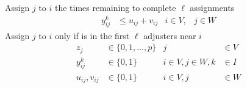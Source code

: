 Assign $j$ to $i$
the times remaining to complete $\ell$ assignments
\begin{align}
  y_{ij}^{k}
  & \leq u_{ij}
  + v_{ij}
  & i \in V,
  & j \in W
\end{align}
Assign $j$ to $i$
only if
is in the first $\ell$ adjusters near $i$
\begin{align}
  z_j
  & \in \{0,1,\ldots,p\}
  & j
  & \in V \nonumber
  \\
  y_{ij}^{k} 
  & \in \{0,1\}
  & i\in V,j\in W,k
  & \in I \nonumber
  \\
  u_{ij},v_{ij}
  & \in \{0,1\}
  & i \in V,j
  & \in W \nonumber
\end{align}
